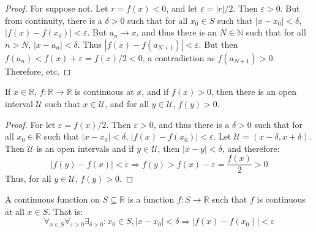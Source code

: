             \begin{proof}
                For suppose not. Let $r=f(x)<0$, and let
                $\varepsilon=|r|/2$. Then $\varepsilon>0$. But
                from continuity, there is a $\delta>0$ such that
                for all $x_{0}\in{S}$ such that $|x-x_{0}|<\delta$,
                $|f(x)-f(x_{0})|<\varepsilon$. But
                $a_{n}\rightarrow{x}$, and thus there is an
                $N\in\mathbb{N}$ such that for all $n>N$,
                $|x-a_{n}|<\delta$. Thus
                $|f(x)-f(a_{N+1})|<\varepsilon$. But then
                $f(a_{n})<f(x)+\varepsilon=f(x)/2<0$,
                a contradiction as $f(a_{N+1})>0$. Therefore, etc.
            \end{proof}
            \begin{theorem}
                If $x\in\mathbb{R}$,
                $f:\mathbb{R}\rightarrow\mathbb{R}$ is
                continuous at $x$, and if $f(x)>0$,
                then there is an open interval
                $\mathcal{U}$ such that $x\in\mathcal{U}$,
                and for all $y\in\mathcal{U}$, $f(y)>0$.
            \end{theorem}
            \begin{proof}
                For let $\varepsilon=f(x)/2$. Then
                $\varepsilon>0$, and thus there is a $\delta>0$
                such that for all $x_{0}\in\mathbb{R}$
                such that $|x-x_{0}|<\delta$,
                $|f(x)-f(x_{0})|<\varepsilon$. Let
                $\mathcal{U}=(x-\delta,x+\delta)$.
                Then $\mathcal{U}$ is an open intervals and if
                $y\in\mathcal{U}$, then $|x-y|<\delta$,
                and therefore:
                \begin{equation}
                    |f(y)-f(x)|<\varepsilon
                    \Rightarrow
                    f(y)>f(x)-\varepsilon
                    =\frac{f(x)}{2}>0
                \end{equation}
                Thus, for all $y\in\mathcal{U}$, $f(y)>0$.
            \end{proof}
            \begin{definition}
                A continuous function on
                $S\subseteq\mathbb{R}$ is a function
                $f:S\rightarrow\mathbb{R}$ such that
                $f$ is continuous at all $x\in{S}$. That is:
                \begin{equation}
                    \forall_{x\in{S}}\forall_{\varepsilon>0}
                    \exists_{\delta>0}:x_{0}\in{S},
                    |x-x_{0}|<\delta
                    \Rightarrow|f(x)-f(x_{0})|<\varepsilon
                \end{equation}
            \end{definition}
